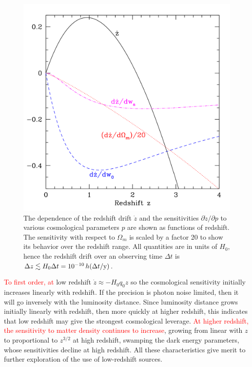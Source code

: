 \documentclass[preprint2, 10pt]{aastex}
\begin{document}
\begin{figure}[!htbp] 
   \centering
   \includegraphics[width=\columnwidth]{zdriftd.pdf}
\caption{The dependence of the redshift drift $\dot z$ and the sensitivities 
$\partial\dot z/\partial p$ to various cosmological parameters $p$ are shown 
as functions of redshift. The sensitivity with respect to $\Omega_m$ is 
scaled by a factor 20 to show its behavior over the redshift range. All quantities are in units of $H_0$, hence 
the redshift drift over an observing time $\Delta t$ is 
$\Delta z\lesssim H_0\Delta t=10^{-10}\,h(\Delta t/{\rm y})$. 
}
\label{fig:sens} 
\end{figure}

\textcolor{red}
{To first order, at}
low redshift $\dot z\approx -H_0q_0z$ so the cosmological sensitivity 
initially increases linearly with redshift. If the precision is photon 
noise limited, then it will go inversely with the luminosity distance. 
Since luminosity distance grows initially linearly with redshift, then 
more quickly at higher redshift, this indicates that low redshift may give 
the strongest cosmological leverage. 
\textcolor{red}{
At higher redshift, the sensitivity to matter density 
continues to increase}, growing from linear with $z$ to 
proportional to $z^{3/2}$ at high redshift, swamping the dark energy 
parameters, whose sensitivities decline at high redshift. All these 
characteristics give merit to further exploration of the use of 
low-redshift sources. 
\end{document}
